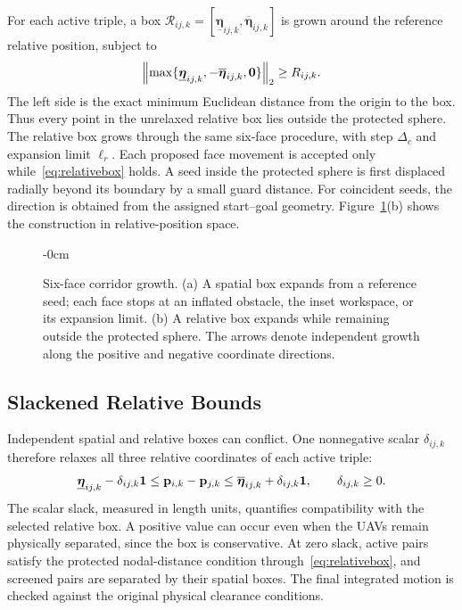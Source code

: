 For each active triple, a box $\mathcal R_{ij,k}=[\underline{\boldsymbol\eta}_{ij,k},\overline{\boldsymbol\eta}_{ij,k}]$ is grown around the reference relative position, subject to
\begin{equation}
 \left\lVert \max\{\underline{\boldsymbol\eta}_{ij,k},-\overline{\boldsymbol\eta}_{ij,k},\mathbf0\}\right\rVert_2
 \geq R_{ij,k}.
 \label{eq:relativebox}
\end{equation}
The left side is the exact minimum Euclidean distance from the origin to the box. Thus every point in the unrelaxed relative box lies outside the protected sphere. The relative box grows through the same six-face procedure, with step $\Delta_c$ and expansion limit $\ell_r$. Each proposed face movement is accepted only while~\eqref{eq:relativebox} holds. A seed inside the protected sphere is first displaced radially beyond its boundary by a small guard distance. For coincident seeds, the direction is obtained from the assigned start--goal geometry. Figure~\ref{fig:corridor}(b) shows the construction in relative-position space.
\begin{figure}[htbp]
\begin{adjustwidth}{-\extralength}{0cm}
\centering\resizebox{\fulllength}{!}{}
\caption{Six-face corridor growth. (a) A spatial box expands from a reference seed; each face stops at an inflated obstacle, the inset workspace, or its expansion limit. (b) A relative box expands while remaining outside the protected sphere. The arrows denote independent growth along the positive and negative coordinate directions.\label{fig:corridor}}
\end{adjustwidth}
\end{figure}

\subsection{Slackened Relative Bounds}
Independent spatial and relative boxes can conflict. One nonnegative scalar $\delta_{ij,k}$ therefore relaxes all three relative coordinates of each active triple:
\begin{equation}
 \underline{\boldsymbol\eta}_{ij,k}-\delta_{ij,k}\mathbf{1}
 \leq\mathbf{p}_{i,k}-\mathbf{p}_{j,k}
 \leq\overline{\boldsymbol\eta}_{ij,k}+\delta_{ij,k}\mathbf{1},
 \qquad\delta_{ij,k}\geq0.
 \label{eq:relativeSlack}
\end{equation}
The scalar slack, measured in length units, quantifies compatibility with the selected relative box. A positive value can occur even when the UAVs remain physically separated, since the box is conservative. At zero slack, active pairs satisfy the protected nodal-distance condition through~\eqref{eq:relativebox}, and screened pairs are separated by their spatial boxes. The final integrated motion is checked against the original physical clearance conditions.
